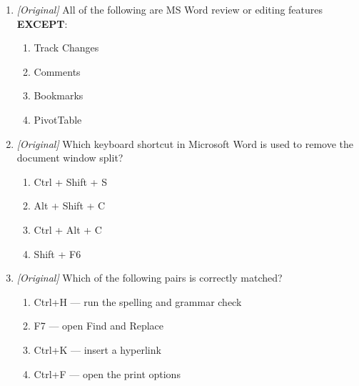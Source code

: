 \begin{enumerate}[label=\textbf{Q\arabic*.}, leftmargin=*]
\begin{enumerate}[label=\Alph*.]
    \item Ctrl+S --- Print; Ctrl+P --- Save
    \item Ctrl+S --- Save; Ctrl+P --- Print
    \item Ctrl+S --- Spelling; Ctrl+P --- Paste
    \item Ctrl+S --- Select all; Ctrl+P --- Print preview
  \end{enumerate}
\item \textit{[Original]} All of the following are MS Word review or editing
  features \textbf{EXCEPT}:
  \begin{enumerate}[label=\Alph*.]
    \item Track Changes
    \item Comments
    \item Bookmarks
    \item PivotTable
  \end{enumerate}
\item \textit{[Original]} Which keyboard shortcut in Microsoft
Word is used to remove the document window split?
  \begin{enumerate}[label=\Alph*.]
    \item Ctrl + Shift + S
    \item Alt + Shift + C
    \item Ctrl + Alt + C
    \item Shift + F6
  \end{enumerate}
\item \textit{[Original]} Which of the following pairs is correctly matched?
  \begin{enumerate}[label=\Alph*.]
    \item Ctrl+H --- run the spelling and grammar check
    \item F7 --- open Find and Replace
    \item Ctrl+K --- insert a hyperlink
    \item Ctrl+F --- open the print options
  \end{enumerate}


\end{enumerate}
